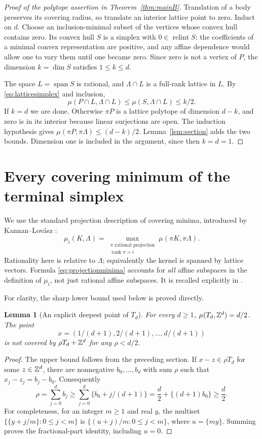 \documentclass[11pt,a4paper]{article}
\newtheorem{lemma}[theorem]{Lemma}
\theoremstyle{definition}\newtheorem{definition}[theorem]{Definition}
\theoremstyle{remark}\newtheorem{remark}[theorem]{Remark}
\DeclareMathOperator{\Span}{span}
\DeclareMathOperator{\relint}{relint}
\begin{document}
\begin{proof}[Proof of the polytope assertion in Theorem~\ref{thm:mainB}]
Translation of a body preserves its covering radius, so translate
an interior lattice point to zero. Induct on $d$.
Choose an inclusion-minimal subset of the vertices whose convex
hull contains zero. Its convex hull $S$ is a simplex with
$0\in\relint S$: the coefficients of a minimal convex
representation are positive, and any affine dependence would allow
one to vary them until one became zero. Since zero is not a vertex
of $P$, the dimension $k=\dim S$ satisfies $1\le k\le d$.

The space $L=\Span S$ is rational, and $\Lambda\cap L$ is a
full-rank lattice in $L$. By \eqref{eq:latticesimplex} and inclusion,
\[
 \mu(P\cap L,\Lambda\cap L)\le
 \mu(S,\Lambda\cap L)\le k/2.
\]
If $k=d$ we are done. Otherwise $\pi P$ is a lattice polytope of
dimension $d-k$, and zero is in its interior because linear
surjections are open. The induction hypothesis gives
$\mu(\pi P,\pi\Lambda)\le(d-k)/2$.
Lemma~\ref{lem:section} adds the two bounds. Dimension one is
included in the argument, since then $k=d=1$.
\end{proof}

\section{Every covering minimum of the terminal simplex}
\label{sec:minima}
We use the standard projection description of covering minima,
introduced by Kannan--Lov\'asz \cite{KL}:
\begin{equation}\label{eq:projectionminima}
 \mu_i(K,\Lambda)=
 \max_{\substack{\pi\text{ rational projection}\\\operatorname{rank}\pi=i}}
       \mu(\pi K,\pi\Lambda).
\end{equation}
Rationality here is relative to $\Lambda$; equivalently the kernel
is spanned by lattice vectors. Formula
\eqref{eq:projectionminima} accounts for \emph{all} affine subspaces
in the definition of $\mu_i$, not just rational affine subspaces.
It is recalled explicitly in \cite[\S1.1]{Krivokuca}.

For clarity, the sharp lower bound used below is proved directly.

\begin{lemma}[An explicit deepest point of $T_d$]\label{lem:terminalsharp}
For every $d\ge1$, $\mu(T_d,\mathbb Z^d)=d/2$. The point
\[
 x=(1/(d+1),2/(d+1),\ldots,d/(d+1))
\]
is not covered by $\rho T_d+\mathbb Z^d$ for any $\rho<d/2$.
\end{lemma}
\begin{proof}
The upper bound follows from the preceding section. If
$x-z\in\rho T_d$ for some $z\in\mathbb Z^d$, there are nonnegative
$b_0,\ldots,b_d$ with sum $\rho$ such that
$x_j-z_j=b_j-b_0$. Consequently
\[
 \rho=\sum_{j=0}^db_j
 \ge\sum_{j=0}^d\{b_0+j/(d+1)\}
 =\frac d2+\{(d+1)b_0\}\ge\frac d2.
\]
For completeness, for an integer $m\ge1$ and real $y$, the multiset
$\{\{y+j/m\}:0\le j<m\}$ is
$\{(u+j)/m:0\le j<m\}$, where $u=\{my\}$.
Summing proves the fractional-part identity, including $u=0$.
\end{proof}
\end{document}
